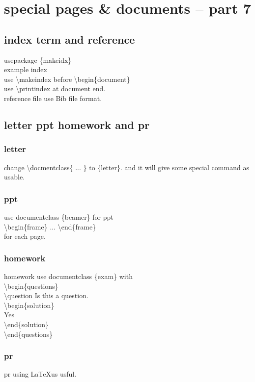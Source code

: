 \documentclass[11pt,a4paper]{article}
\begin{document}
\section{special pages \& documents -- part 7}{
  \subsection{index term and reference}{
    usepackage \{makeidx\}\\
    example index \\
    use \textbackslash{}makeindex before \textbackslash{}begin\{document\} \\
    use \textbackslash{}printindex at document end. \\
    reference file use Bib file format.
  }
  \subsection{letter ppt homework and pr}{
    \subsubsection{letter}
    change \textbackslash{}docmentclass\{ ... \} to \{letter\}.
    and it will give some special command as usable.

    \subsubsection{ppt}
    use documentclass \{beamer\} for ppt \\
    \textbackslash{}begin\{frame\} ... \textbackslash{}end\{frame\} \\
    for each page.\\

    \subsubsection{homework}
    homework use documentclass \{exam\} with \\
    \textbackslash{}begin\{questions\}\\
    \textbackslash{}question Is this a question.\\
    \textbackslash{}begin\{solution\}\\
    Yes\\
    \textbackslash{}end\{solution\}\\
    \textbackslash{}end\{questions\}\\

    \subsubsection{pr}
    pr using \LaTeX us usful.
  }
}

\printindex %
\end{document}
